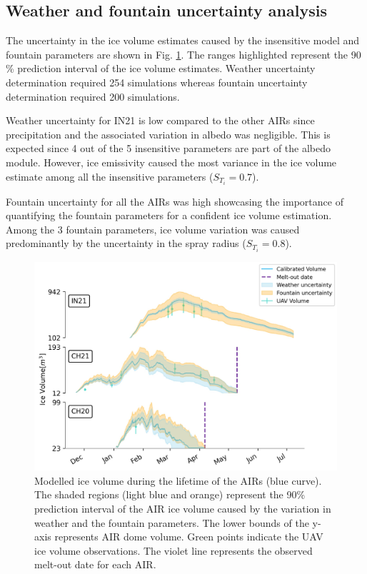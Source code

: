 \documentclass[utf8]{frontiersSCNS} %
\begin{document}
\subsection{Weather and fountain uncertainty analysis}

The uncertainty in the ice volume estimates caused by the insensitive model and fountain parameters are shown in
Fig. \ref{fig:results}. The ranges highlighted represent the 90 \% prediction interval of the ice volume estimates.
Weather uncertainty determination required 254 simulations whereas fountain uncertainty determination required 200 simulations.

Weather uncertainty for IN21 is low compared to the other AIRs since precipitation and the associated variation in
albedo was negligible. This is expected since 4 out of the 5 insensitive parameters are part of the albedo module.
However, ice emissivity caused the most variance in the ice volume estimate among all the insensitive parameters
($S_{T_{i}} = 0.7$).

Fountain uncertainty for all the AIRs was high showcasing the importance of quantifying the fountain parameters for
a confident ice volume estimation. Among the 3 fountain parameters, ice volume variation was caused predominantly
by the uncertainty in the spray radius ($S_{T_{i}} = 0.8$).

\begin{figure}
	\begin{center}
		\includegraphics[width=\linewidth]{Figures/icev_results.jpg}
	\end{center}
	\caption{Modelled ice volume during the lifetime of the AIRs (blue curve). The shaded regions (light blue and orange)
		represent the 90\% prediction interval of the AIR ice volume caused by the variation in weather and the fountain parameters.
		The lower bounds of the y-axis represents AIR dome volume. Green points indicate the UAV ice volume observations.
		The violet line represents the observed melt-out date for each AIR.  }

	\label{fig:results}
\end{figure}
\end{document}
